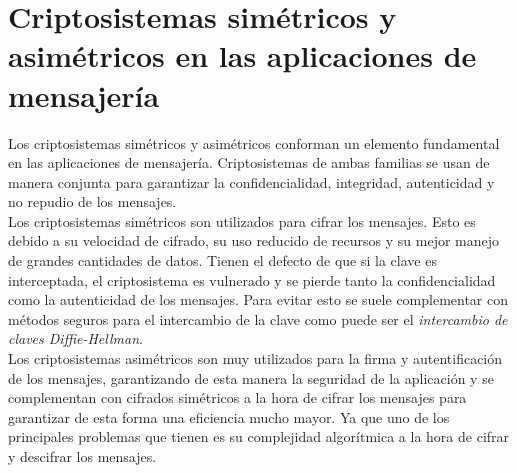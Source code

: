 \section{Criptosistemas simétricos y asimétricos en las aplicaciones de mensajería}
Los criptosistemas simétricos y asimétricos conforman un elemento fundamental en las aplicaciones de mensajería. Criptosistemas de ambas familias se usan de manera conjunta para garantizar la confidencialidad, integridad, autenticidad y no repudio de los mensajes.\\
Los criptosistemas simétricos son utilizados para cifrar los mensajes. Esto es debido a su velocidad de cifrado, su uso reducido de recursos y su mejor manejo de grandes cantidades de datos.
Tienen el defecto de que si la clave es interceptada, el criptosistema es vulnerado y se pierde tanto la confidencialidad como la autenticidad de los mensajes. 
Para evitar esto se suele complementar con métodos seguros para el intercambio de la clave como puede ser el \emph{intercambio de claves Diffie-Hellman}.\\
Los criptosistemas asimétricos son muy utilizados para la firma y autentificación de los mensajes, garantizando de esta manera la seguridad de la aplicación y se complementan con cifrados simétricos a la hora de cifrar los mensajes para garantizar de esta forma una eficiencia mucho mayor. Ya que uno de los principales problemas que tienen es su complejidad algorítmica a la hora de cifrar y descifrar los mensajes.\\

